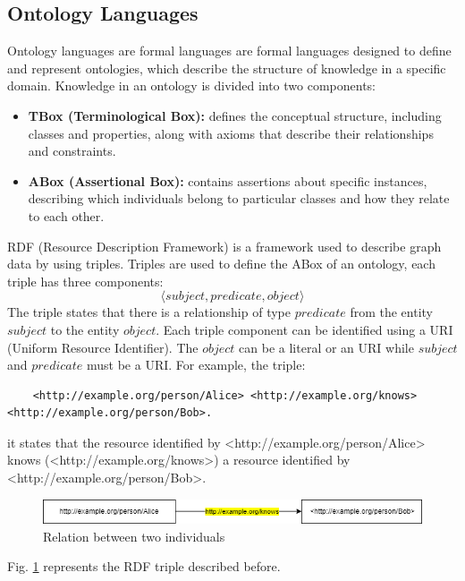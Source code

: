\subsection{Ontology Languages}
Ontology languages are formal languages are formal languages designed to define and represent ontologies, which describe the structure of knowledge in a specific domain.\cite{ontolang_wiki}
Knowledge in an ontology is divided into two components:
\begin{itemize}
    \item \textbf{TBox (Terminological Box):} defines the conceptual structure, including classes and properties, along with axioms that describe their relationships and constraints.

    \item \textbf{ABox (Assertional Box):} contains assertions about specific instances, describing which individuals belong to particular classes and how they relate to each other.
\end{itemize}
RDF (Resource Description Framework) is a framework used to describe graph data by using triples. Triples are used to define the ABox of an ontology, each triple has three components: 
$$
\langle subject, predicate, object\rangle
$$
The triple states that there is a relationship of type $predicate$ from the entity $subject$ to the entity $object$. Each triple component can be identified using a URI (Uniform Resource Identifier). The $object$ can be a literal or an URI while $subject$ and $predicate$ must be a URI.
For example, the triple:
\begin{lstlisting}
    <http://example.org/person/Alice> <http://example.org/knows> <http://example.org/person/Bob>.
\end{lstlisting}
it states that the resource identified by <http://example.org/person/Alice> knows (<http://example.org/knows>) a resource identified by <http://example.org/person/Bob>.
\begin{figure}[H]
    \centering
    \includegraphics[width=0.9\linewidth]{Figures/fig_86.png}
    \caption{Relation between two individuals}
    \label{fig:86}
\end{figure}
Fig. \ref{fig:86} represents the RDF triple described before.

